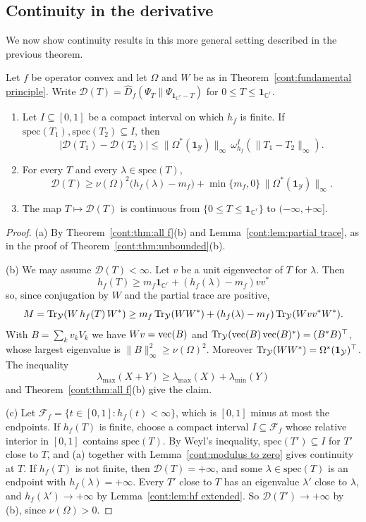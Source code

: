 \subsection{Continuity in the derivative}
We now show continuity results in this more general setting described in the previous theorem. 
\begin{theorem}\label{cont:thm:extended continuity}
Let $f$ be operator convex and let $\Omega$ and $W$ be as in Theorem~\ref{cont:fundamental principle}. Write $\mathcal{D}(T)=\widehat{D}_f(\Psi_T\|\Psi_{\mathbf{1}_{\mathbb{C}^r}-T})$ for $0\leq T\leq\mathbf{1}_{\mathbb{C}^r}$.
\begin{enumerate}
\item[(a)] Let $I\subseteq[0,1]$ be a compact interval on which $h_f$ is finite. If $\mathrm{spec}(T_1),\mathrm{spec}(T_2)\subseteq I$, then
\[
|\mathcal{D}(T_1)-\mathcal{D}(T_2)|\leq\|\Omega^*(\mathbf{1}_{\mathcal{Y}})\|_\infty\,\omega^I_{h_f}(\|T_1-T_2\|_\infty).
\]
\item[(b)] For every $T$ and every $\lambda\in\mathrm{spec}(T)$,
\[
\mathcal{D}(T)\geq\nu(\Omega)^2\big(h_f(\lambda)-m_f\big)+\min\{m_f,0\}\,\|\Omega^*(\mathbf{1}_{\mathcal{Y}})\|_\infty .
\]
\item[(c)] The map $T\mapsto\mathcal{D}(T)$ is continuous from $\{0\leq T\leq\mathbf{1}_{\mathbb{C}^r}\}$ to $(-\infty,+\infty]$.
\end{enumerate}
\end{theorem}

\begin{proof}
(a) By Theorem~\ref{cont:thm:all f}(b) and Lemma~\ref{cont:lem:partial trace}, as in the proof of Theorem~\ref{cont:thm:unbounded}(b).

(b) We may assume $\mathcal{D}(T)<\infty$. Let $v$ be a unit eigenvector of $T$ for $\lambda$. Then \[h_f(T)\geq m_f\mathbf{1}_{\mathbb{C}^r}+(h_f(\lambda)-m_f)vv^*\] so, since conjugation by $W$ and the partial trace are positive,
\[
M=\operatorname{Tr}_{\mathcal{Y}}(W\,h_f(T)\,W^*)\geq m_f\operatorname{Tr}_{\mathcal{Y}}(WW^*)+(h_f(\lambda)-m_f)\operatorname{Tr}_{\mathcal{Y}}(Wvv^*W^*).
\]
With $B=\sum_kv_kV_k$ we have $Wv=\operatorname{vec}(B)$ and $\operatorname{Tr}_{\mathcal{Y}}(\operatorname{vec}(B)\operatorname{vec}(B)^*)=(B^*B)^\top$, whose largest eigenvalue is $\|B\|_\infty^2\geq\nu(\Omega)^2$. Moreover $\operatorname{Tr}_{\mathcal{Y}}(WW^*)=\Omega^*(\mathbf{1}_{\mathcal{Y}})^\top$. The inequality \[\lambda_{\max}(X+Y)\geq\lambda_{\max}(X)+\lambda_{\min}(Y)\] and Theorem~\ref{cont:thm:all f}(b) give the claim.

(c) Let $\mathcal{F}_f=\{t\in[0,1]:h_f(t)<\infty\}$, which is $[0,1]$ minus at most the endpoints. If $h_f(T)$ is finite, choose a compact interval $I\subseteq \mathcal{F}_f$ whose relative interior in $[0,1]$ contains $\mathrm{spec}(T)$. By Weyl's inequality, $\mathrm{spec}(T')\subseteq I$ for $T'$ close to $T$, and (a) together with Lemma~\ref{cont:modulus to zero} gives continuity at $T$. If $h_f(T)$ is not finite, then $\mathcal{D}(T)=+\infty$, and some $\lambda\in\mathrm{spec}(T)$ is an endpoint with $h_f(\lambda)=+\infty$. Every $T'$ close to $T$ has an eigenvalue $\lambda'$ close to $\lambda$, and $h_f(\lambda')\to+\infty$ by Lemma~\ref{cont:lem:hf extended}. So $\mathcal{D}(T')\to+\infty$ by (b), since $\nu(\Omega)>0$.
\end{proof}

